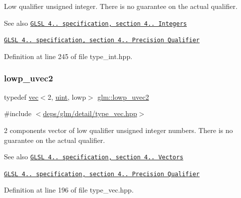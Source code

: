 Low qualifier unsigned integer. There is no guarantee on the actual qualifier.

\begin{DoxySeeAlso}{See also}
\href{http://www.opengl.org/registry/doc/GLSLangSpec.4.20.8.pdf}{\tt G\+L\+SL 4.. specification, section 4.. Integers} 

\href{http://www.opengl.org/registry/doc/GLSLangSpec.4.20.8.pdf}{\tt G\+L\+SL 4.. specification, section 4.. Precision Qualifier} 
\end{DoxySeeAlso}


Definition at line 245 of file type\+\_\+int.\+hpp.

\mbox{\label{group__core__precision_gaf2f2771efb431071890586c01401ebd8}} 
\subsubsection{\texorpdfstring{lowp\+\_\+uvec2}{lowp\_uvec2}}
{\footnotesize\ttfamily typedef \hyperlink{structglm_1_1vec}{vec}$<$2, \hyperlink{group__core__precision_ga4fd29415871152bfb5abd588334147c8}{uint}, lowp$>$ \hyperlink{group__core__precision_gaf2f2771efb431071890586c01401ebd8}{glm\+::lowp\+\_\+uvec2}}



{\ttfamily \#include $<$\hyperlink{type__vec_8hpp}{deps/glm/detail/type\+\_\+vec.\+hpp}$>$}

2 components vector of low qualifier unsigned integer numbers. There is no guarantee on the actual qualifier.

\begin{DoxySeeAlso}{See also}
\href{http://www.opengl.org/registry/doc/GLSLangSpec.4.20.8.pdf}{\tt G\+L\+SL 4.. specification, section 4.. Vectors} 

\href{http://www.opengl.org/registry/doc/GLSLangSpec.4.20.8.pdf}{\tt G\+L\+SL 4.. specification, section 4.. Precision Qualifier} 
\end{DoxySeeAlso}


Definition at line 196 of file type\+\_\+vec.\+hpp.

\mbox{\label{group__core__precision_gab06a83e99d38e15a3e54d38208b9deba}} 
